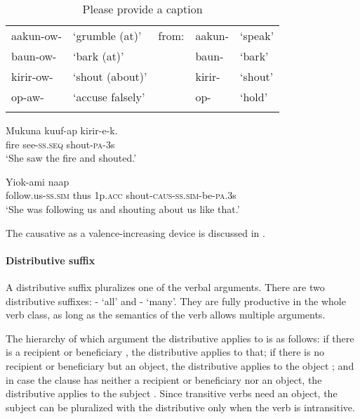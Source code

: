 \begin{table}
\caption{Please provide a caption}
\label{} 
\begin{tabular}{lllll}
\mytoprule
aakun-ow- &`grumble (at)' &from: &aakun- &`speak'\\
baun-ow- &`bark (at)' & &baun- &`bark'\\
kirir-ow- &`shout (about)' & &kirir- &`shout'\\
op-aw- &`accuse falsely' & &op- &`hold'\\
\mybottomrule
\end{tabular} 

\end{table}

\ea%
\label{ex:3:x991}
\gll Mukuna kuuf-ap kirir-e-k. \\
fire see-\textsc{ss}.\textsc{seq} shout-\textsc{pa}-3s\\
\glt`She saw the fire and shouted.'
\z

\ea%
\label{ex:3:x489}
\gll Yiok-ami naap   \\
follow.us-\textsc{ss}.\textsc{sim} thus 1p.\textsc{acc} shout-\textsc{caus}-\textsc{ss}.\textsc{sim}-be-\textsc{pa}.3s\\
\glt`She was following us and shouting about us like that.'
\z

The causative as a valence-increasing device is discussed in . 

\paragraph{Distributive suffix}\label{sec:3.8.2.3.2}
{}
A distributive suffix pluralizes one of the verbal arguments. There are two distributive suffixes: \nobreakdash- `all' and \nobreakdash- `many'. They are fully productive in the whole verb class, as long as the semantics of the verb allows multiple arguments. 

The hierarchy of which argument the distributive applies to is as follows: if there is a recipient  or beneficiary , the distributive applies to that; if there is no recipient or beneficiary but an object, the distributive applies to the object ; and in case the clause has neither a recipient or beneficiary nor an object, the distributive applies to the subject . Since transitive verbs need an object, the subject can be pluralized with the distributive only when the verb is intransitive.

